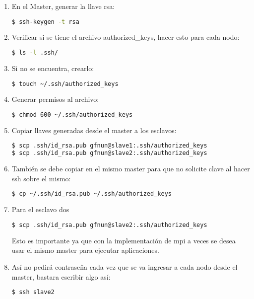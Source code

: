 \begin{enumerate}
    \item En el Master, generar la llave rsa:
    
\begin{lstlisting}[language=bash,style=mystyle]
$ ssh-keygen -t rsa
\end{lstlisting} 

    \item Verificar si se tiene el archivo authorized\_keys, hacer esto para cada nodo:
    
\begin{lstlisting}[language=bash,style=mystyle]
$ ls -l .ssh/
\end{lstlisting}

    \item Si no se encuentra, crearlo:
\begin{lstlisting}[language=bash,style=mystyle]
$ touch ~/.ssh/authorized_keys
\end{lstlisting} 

    \item Generar permisos al archivo:
\begin{lstlisting}[language=bash,style=mystyle]
$ chmod 600 ~/.ssh/authorized_keys
\end{lstlisting}

    \item Copiar llaves generadas desde el master a los esclavos:
\begin{lstlisting}[language=bash,style=mystyle]
$ scp .ssh/id_rsa.pub gfnun@slave1:.ssh/authorized_keys
$ scp .ssh/id_rsa.pub gfnun@slave2:.ssh/authorized_keys
\end{lstlisting}

    \item También se debe copiar en el mismo master para que no solicite clave al hacer ssh sobre el mismo:
\begin{lstlisting}[language=bash,style=mystyle]
$ cp ~/.ssh/id_rsa.pub ~/.ssh/authorized_keys
\end{lstlisting}

    \item Para el esclavo dos
\begin{lstlisting}[language=bash,style=mystyle]
$ scp .ssh/id_rsa.pub gfnun@slave2:.ssh/authorized_keys
\end{lstlisting} 

Esto es importante ya que con la implementación de mpi a veces se desea usar el mismo master para ejecutar aplicaciones.

    \item Así no pedirá contraseña cada vez que se va ingresar a cada nodo desde el master, bastara escribir algo así:
    
\begin{lstlisting}[language=bash,style=mystyle]
$ ssh slave2
\end{lstlisting} 
    
\end{enumerate}






 















\newpage

